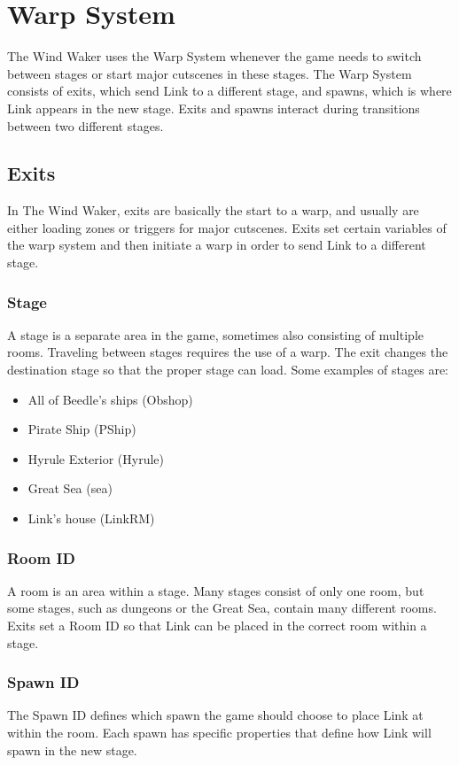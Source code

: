 \documentclass[titlepage,12pt,a4paper]{article}
\let\stdsection\section
\renewcommand\section{\newpage\stdsection}
\begin{document}
\section{Warp System}
The Wind Waker uses the Warp System whenever the game needs to switch between stages or start major cutscenes in these stages. The Warp System consists of exits, which send Link to a different stage, and spawns, which is where Link appears in the new stage. Exits and spawns interact during transitions between two different stages.

\subsection{Exits}
In The Wind Waker, exits are basically the start to a warp, and usually are either loading zones or triggers for major cutscenes. Exits set certain variables of the warp system and then initiate a warp in order to send Link to a different stage.

\subsubsection{Stage}
A stage is a separate area in the game, sometimes also consisting of multiple rooms. Traveling between stages requires the use of a warp. The exit changes the destination stage so that the proper stage can load. Some examples of stages are: 
\begin{itemize}
	\item All of Beedle’s ships (Obshop)
	\item Pirate Ship (PShip)
	\item Hyrule Exterior (Hyrule)
	\item Great Sea (sea)
	\item Link’s house (LinkRM)
\end{itemize}

\subsubsection{Room ID}
A room is an area within a stage. Many stages consist of only one room, but some stages, such as dungeons or the Great Sea, contain many different rooms. Exits set a Room ID so that Link can be placed in the correct room within a stage.

\subsubsection{Spawn ID}
The Spawn ID defines which spawn the game should choose to place Link at within the room. Each spawn has specific properties that define how Link will spawn in the new stage.
\end{document}
